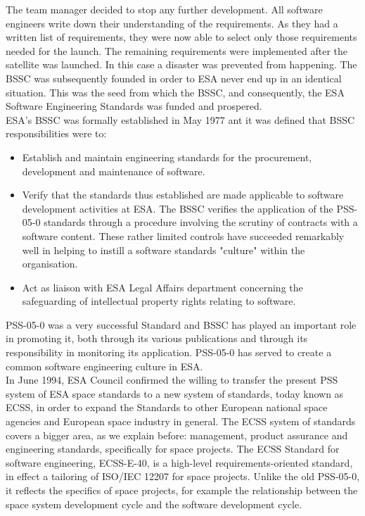 The team manager decided to stop any further development. All software engineers write down their understanding of the requirements.
As they had a written list of requirements, they were now able to select only
those requirements needed for the launch. The remaining requirements were implemented after
the satellite was launched. In this case a disaster was prevented from happening\cite{Zwartjes05anagile}.
The \ac{BSSC} was subsequently founded in order to \ac{ESA} never end up in an identical situation. This was the seed from
which the \ac{BSSC}, and consequently, the \ac{ESA} Software Engineering Standards was funded and prospered.\\
\ac{ESA}'s \ac{BSSC} was formally established in May 1977 ant it was defined that \ac{BSSC} responsibilities were to:
\begin{itemize}
\item Establish and maintain engineering standards for the procurement, development and maintenance of software.
\item Verify that the standards thus established are made applicable to software
development activities at \ac{ESA}. The \ac{BSSC} verifies the application of the PSS-05-0\cite{pss-05-0} standards through a procedure involving the
scrutiny of contracts with a software content.
These rather limited controls have succeeded remarkably well in helping to instill a software standards "culture" within the organisation.
\item Act as liaison with \ac{ESA} Legal Affairs department concerning the safeguarding of intellectual
property rights relating to software.
\end{itemize}
PSS-05-0 was a very successful Standard and \ac{BSSC} has played an important role in promoting it, both through its various
publications and through its responsibility in monitoring its application. PSS-05-0 has served to create a common software engineering culture in \ac{ESA}\cite{esa-bulletin-90}.\\
In June 1994, \ac{ESA} Council confirmed the willing to transfer the present PSS system of \ac{ESA} space standards to a new system
of standards, today known as \ac{ECSS}, in order to expand the Standards 
to other European national space agencies and European space industry in general.
The \ac{ECSS} system of standards covers a bigger area, as we explain before: management, product assurance and engineering standards, specifically for space projects.
The \ac{ECSS} Standard for software engineering, ECSS-E-40\cite{ecss-e-st-40c}, is a high-level requirements-oriented standard, in effect a tailoring of ISO/IEC 12207 for space projects.
Unlike the old PSS-05-0, it reflects the specifics of space projects, for example the relationship between the space system development cycle and the software development cycle\cite{esa-bulletin-90}.

